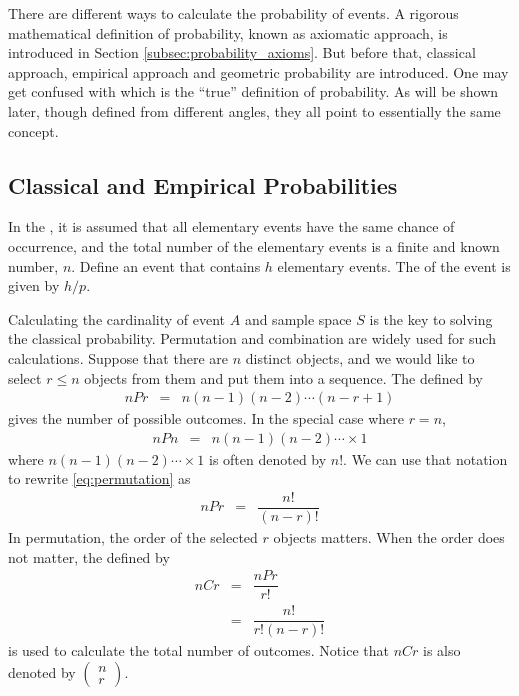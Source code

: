 There are different ways to calculate the probability of events. A rigorous mathematical definition of probability, known as axiomatic approach, is introduced in Section \ref{subsec:probability_axioms}. But before that, classical approach, empirical approach and geometric probability are introduced. One may get confused with which is the ``true'' definition of probability. As will be shown later, though defined from different angles, they all point to essentially the same concept.

\subsection{Classical and Empirical Probabilities}

In the , it is assumed that all elementary events have the same chance of occurrence, and the total number of the elementary events is a finite and known number, $n$. Define an event that contains $h$ elementary events. The  of the event is given by $h/p$.

Calculating the cardinality of event $A$ and sample space $S$ is the key to solving the classical probability. Permutation and combination are widely used for such calculations. Suppose that there are $n$ distinct objects, and we would like to select $r\leq n$ objects from them and put them into a sequence. The  defined by
\begin{eqnarray}
  nPr &=& n(n-1)(n-2)\cdots (n-r+1) \label{eq:permutation}
\end{eqnarray}
gives the number of possible outcomes. In the special case where $r=n$,
\begin{eqnarray}
  nPn &=& n(n-1)(n-2)\cdots \times 1 \nonumber
\end{eqnarray}
where $n(n-1)(n-2)\cdots \times 1$ is often denoted by $n!$. We can use that notation to rewrite \eqref{eq:permutation} as
\begin{eqnarray}
  nPr &=& \dfrac{n!}{(n-r)!} \nonumber
\end{eqnarray}
In permutation, the order of the selected $r$ objects matters. When the order does not matter, the  defined by
\begin{eqnarray}
  nCr &=& \dfrac{nPr}{r!} \nonumber \\
  &=& \dfrac{n!}{r!(n-r)!} \nonumber
\end{eqnarray}
is used to calculate the total number of outcomes. Notice that $nCr$ is also denoted by $\left(\begin{array}{c}
                                                                                           n \\
                                                                                           r
                                                                                         \end{array}\right)$.

